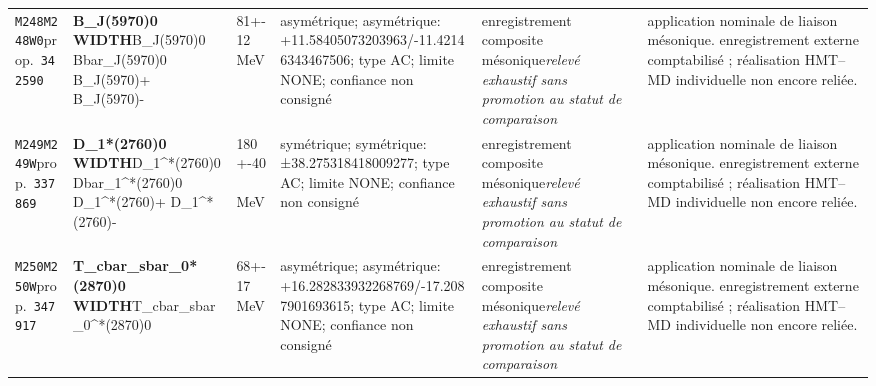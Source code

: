 \begin{landscape}
\begin{longtable}{L{1.85cm}L{4.45cm}L{2.35cm}L{4.05cm}L{3.35cm}L{7.15cm}}
\texttt{M248}\newline \texttt{M248W0}\newline prop.\ \texttt{342590} & \textbf{B\_\allowbreak{}J(5970)0 WIDTH}\newline B\_\allowbreak{}J(5970)0 \textbar{}\allowbreak{} Bbar\_\allowbreak{}J(5970)0 \textbar{}\allowbreak{} B\_\allowbreak{}J(5970)+ \textbar{}\allowbreak{} B\_\allowbreak{}J(5970)- & 81+-12\,MeV & asymétrique; asymétrique: +11.58405073203963/-11.42146343467506; type AC; limite NONE; confiance non consigné & enregistrement composite mésonique\newline \emph{relevé exhaustif sans promotion au statut de comparaison} & application nominale de liaison mésonique. enregistrement externe comptabilisé ; réalisation HMT--MD individuelle non encore reliée. \\
\texttt{M249}\newline \texttt{M249W}\newline prop.\ \texttt{337869} & \textbf{D\_\allowbreak{}1*(2760)0 WIDTH}\newline D\_\allowbreak{}1\textasciicircum{}*(2760)0 \textbar{}\allowbreak{} Dbar\_\allowbreak{}1\textasciicircum{}*(2760)0 \textbar{}\allowbreak{} D\_\allowbreak{}1\textasciicircum{}*(2760)+ \textbar{}\allowbreak{} D\_\allowbreak{}1\textasciicircum{}*(2760)- & 180+-40\,MeV & symétrique; symétrique: ±38.275318418009277; type AC; limite NONE; confiance non consigné & enregistrement composite mésonique\newline \emph{relevé exhaustif sans promotion au statut de comparaison} & application nominale de liaison mésonique. enregistrement externe comptabilisé ; réalisation HMT--MD individuelle non encore reliée. \\
\texttt{M250}\newline \texttt{M250W}\newline prop.\ \texttt{347917} & \textbf{T\_\allowbreak{}cbar\_\allowbreak{}sbar\_\allowbreak{}0*(2870)0 WIDTH}\newline T\_\allowbreak{}cbar\_\allowbreak{}sbar\_\allowbreak{}0\textasciicircum{}*(2870)0 & 68+-17\,MeV & asymétrique; asymétrique: +16.282833932268769/-17.2087901693615; type AC; limite NONE; confiance non consigné & enregistrement composite mésonique\newline \emph{relevé exhaustif sans promotion au statut de comparaison} & application nominale de liaison mésonique. enregistrement externe comptabilisé ; réalisation HMT--MD individuelle non encore reliée. \\

\end{longtable}
\end{landscape}
